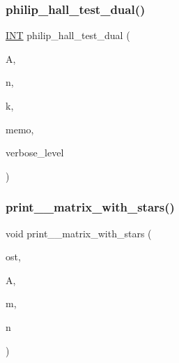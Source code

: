\subsubsection{\texorpdfstring{philip\+\_\+hall\+\_\+test\+\_\+dual()}{philip\_hall\_test\_dual()}}
{\footnotesize\ttfamily \mbox{\hyperlink{galois_8h_a09fddde158a3a20bd2dcadb609de11dc}{I\+NT}} philip\+\_\+hall\+\_\+test\+\_\+dual (\begin{DoxyParamCaption}\item[{\mbox{\hyperlink{galois_8h_a09fddde158a3a20bd2dcadb609de11dc}{I\+NT}} $\ast$}]{A,  }\item[{\mbox{\hyperlink{galois_8h_a09fddde158a3a20bd2dcadb609de11dc}{I\+NT}}}]{n,  }\item[{\mbox{\hyperlink{galois_8h_a09fddde158a3a20bd2dcadb609de11dc}{I\+NT}}}]{k,  }\item[{\mbox{\hyperlink{galois_8h_a09fddde158a3a20bd2dcadb609de11dc}{I\+NT}} $\ast$}]{memo,  }\item[{\mbox{\hyperlink{galois_8h_a09fddde158a3a20bd2dcadb609de11dc}{I\+NT}}}]{verbose\+\_\+level }\end{DoxyParamCaption})}

\mbox{\label{combinatorics_8_c_aab10543fef80475fbe77b7a4bc2aec12}} 
\subsubsection{\texorpdfstring{print\+\_\+\_\+matrix\+\_\+with\+\_\+stars()}{print\_01\_matrix\_with\_stars()}}
{\footnotesize\ttfamily void print\+\_\+\_\+matrix\+\_\+with\+\_\+stars (\begin{DoxyParamCaption}\item[{ostream \&}]{ost,  }\item[{\mbox{\hyperlink{galois_8h_a09fddde158a3a20bd2dcadb609de11dc}{I\+NT}} $\ast$}]{A,  }\item[{\mbox{\hyperlink{galois_8h_a09fddde158a3a20bd2dcadb609de11dc}{I\+NT}}}]{m,  }\item[{\mbox{\hyperlink{galois_8h_a09fddde158a3a20bd2dcadb609de11dc}{I\+NT}}}]{n }\end{DoxyParamCaption})}

\mbox{\label{combinatorics_8_c_ad4cc855d33d97d2b05e36514ffe2ef03}} 
